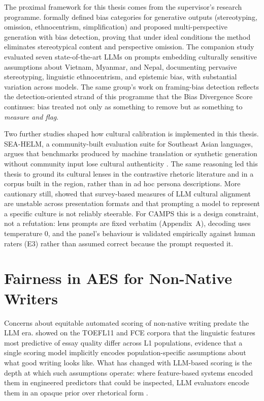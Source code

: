 The proximal framework for this thesis comes from the supervisor's
research programme. \citet{dorleon2026uncovering} formally defined
bias categories for generative outputs (stereotyping, omission,
ethnocentrism, simplification) and proposed multi-perspective
generation with bias detection, proving that under ideal conditions the
method eliminates stereotypical content and perspective omission. The
companion study \citep{shujaa2026llms} evaluated seven state-of-the-art
LLMs on prompts embedding culturally sensitive assumptions about
Vietnam, Myanmar, and Nepal, documenting pervasive stereotyping,
linguistic ethnocentrism, and epistemic bias, with substantial
variation across models. The same group's work on
framing-bias detection \citep{shujaa2025framing} reflects the
detection-oriented strand of this programme that the Bias Divergence
Score continues: bias treated not only as something to remove but as
something to \emph{measure and flag}.

Two further studies shaped how cultural calibration is implemented in
this thesis. SEA-HELM, a community-built evaluation suite for
Southeast Asian languages, argues that benchmarks produced by machine
translation or synthetic generation without community input lose
cultural authenticity \citep{susanto2025seahelm}. The same reasoning
led this thesis to ground its cultural lenses in the contrastive
rhetoric literature and in a corpus built in the region, rather than
in ad hoc persona descriptions. More cautionary still,
\citet{khan2025randomness} showed that survey-based measures of LLM
cultural alignment are unstable across presentation formats and that
prompting a model to represent a specific culture is not reliably
steerable. For CAMPS this is a design constraint, not a refutation:
lens prompts are fixed verbatim (Appendix~A), decoding uses
temperature 0, and the panel's behaviour is validated empirically
against human raters (E3) rather than assumed correct because the
prompt requested it.

\section{Fairness in AES for Non-Native Writers}
\label{sec:lit-aes-fairness}

Concerns about equitable automated scoring of non-native writing
predate the LLM era. \citet{vajjala2018automated} showed on the
TOEFL11 and FCE corpora that the linguistic features most predictive of
essay quality differ across L1 populations, evidence that a single
scoring model implicitly encodes population-specific assumptions about
what good writing looks like. What has changed with LLM-based scoring
is the depth at which such assumptions operate: where feature-based
systems encoded them in engineered predictors that could be inspected,
LLM evaluators encode them in an opaque prior over rhetorical form
\citep[cf.][]{gallegos2024bias}.


